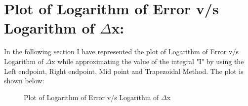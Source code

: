 \documentclass[12pt,a4paper]{article}
\begin{document}
\section{Plot of Logarithm of Error v/s Logarithm of $\Delta$x:}
In the following section I have represented the plot of Logarithm of Error v/s Logarithm of $\Delta$x while approximating the value of the integral "I" by using the Left endpoint, Right endpoint, Mid point and Trapezoidal Method. The plot is shown below:
\begin{figure}[!ht]
	\begin{center}
	\end{center}
	\caption{Plot of Logarithm of Error v/s Logarithm of $\Delta$x}
\end{figure}
\end{document}
